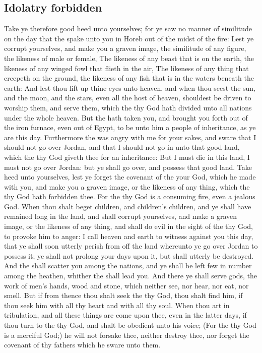 \begin{biblechapter}
\section*{Idolatry forbidden}
\verse Take ye therefore good heed unto yourselves; for ye saw no manner of similitude on the day that the \LORD spake unto you in Horeb out of the midst of the fire:
\verse Lest ye corrupt yourselves, and make you a graven image, the similitude of any figure, the likeness of male or female,
\verse The likeness of any beast that is on the earth, the likeness of any winged fowl that flieth in the air,
\verse The likeness of any thing that creepeth on the ground, the likeness of any fish that is in the waters beneath the earth:
\verse And lest thou lift up thine eyes unto heaven, and when thou seest the sun, and the moon, and the stars, even all the host of heaven, shouldest be driven to worship them, and serve them, which the \LORD thy God hath divided unto all nations under the whole heaven.
\verse But the \LORD hath taken you, and brought you forth out of the iron furnace, even out of Egypt, to be unto him a people of inheritance, as ye are this day.
\verse Furthermore the \LORD was angry with me for your sakes, and sware that I should not go over Jordan, and that I should not go in unto that good land, which the \LORD thy God giveth thee for an inheritance:
\verse But I must die in this land, I must not go over Jordan: but ye shall go over, and possess that good land.
\verse Take heed unto yourselves, lest ye forget the covenant of the \LORD your God, which he made with you, and make you a graven image, or the likeness of any thing, which the \LORD thy God hath forbidden thee.
\verse For the \LORD thy God is a consuming fire, even a jealous God.
\verse When thou shalt beget children, and children's children, and ye shall have remained long in the land, and shall corrupt yourselves, and make a graven image, or the likeness of any thing, and shall do evil in the sight of the \LORD thy God, to provoke him to anger:
\verse I call heaven and earth to witness against you this day, that ye shall soon utterly perish from off the land whereunto ye go over Jordan to possess it; ye shall not prolong your days upon it, but shall utterly be destroyed.
\verse And the \LORD shall scatter you among the nations, and ye shall be left few in number among the heathen, whither the \LORD shall lead you.
\verse And there ye shall serve gods, the work of men's hands, wood and stone, which neither see, nor hear, nor eat, nor smell.
\verse But if from thence thou shalt seek the \LORD thy God, thou shalt find him, if thou seek him with all thy heart and with all thy soul.
\verse When thou art in tribulation, and all these things are come upon thee, even in the latter days, if thou turn to the \LORD thy God, and shalt be obedient unto his voice;
\verse (For the \LORD thy God is a merciful God;) he will not forsake thee, neither destroy thee, nor forget the covenant of thy fathers which he sware unto them.

\end{biblechapter}

